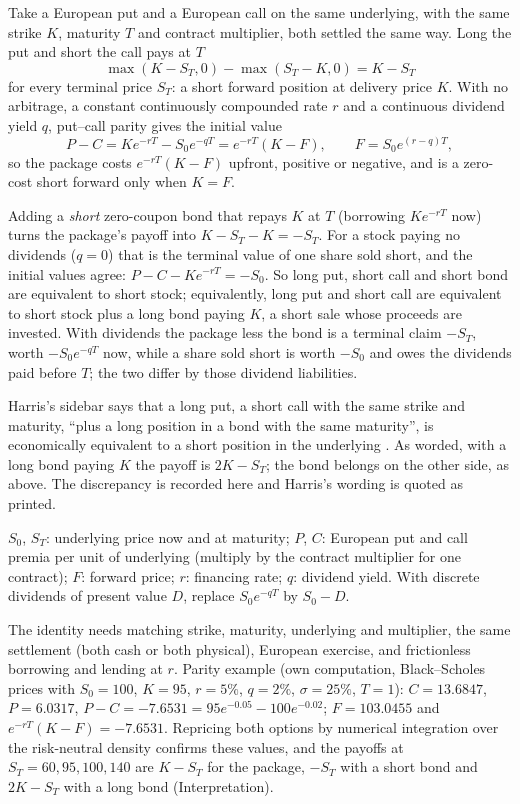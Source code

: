 \begin{qfresult}\label{res:synthetic-short-put-call}
 Take a European put and a European call on the same underlying, with the same strike $K$, maturity $T$ and contract multiplier, both settled the same way. Long the put and short the call pays at $T$
\[ \max(K-S_T,0)-\max(S_T-K,0)=K-S_T \]
for every terminal price $S_T$: a short forward position at delivery price $K$. With no arbitrage, a constant continuously compounded rate $r$ and a continuous dividend yield $q$, put--call parity gives the initial value
\[ P-C=Ke^{-rT}-S_0e^{-qT}=e^{-rT}(K-F),\qquad F=S_0e^{(r-q)T}, \]
so the package costs $e^{-rT}(K-F)$ upfront, positive or negative, and is a zero-cost short forward only when $K=F$.

Adding a \emph{short} zero-coupon bond that repays $K$ at $T$ (borrowing $Ke^{-rT}$ now) turns the package's payoff into $K-S_T-K=-S_T$. For a stock paying no dividends ($q=0$) that is the terminal value of one share sold short, and the initial values agree: $P-C-Ke^{-rT}=-S_0$. So long put, short call and short bond are equivalent to short stock; equivalently, long put and short call are equivalent to short stock plus a long bond paying $K$, a short sale whose proceeds are invested. With dividends the package less the bond is a terminal claim $-S_T$, worth $-S_0e^{-qT}$ now, while a share sold short is worth $-S_0$ and owes the dividends paid before $T$; the two differ by those dividend liabilities.

Harris's sidebar says that a long put, a short call with the same strike and maturity, ``plus a long position in a bond with the same maturity'', is economically equivalent to a short position in the underlying \citep[chap.~``Brokers'', sidebar ``Synthetic Short Positions'', p.~157]{alpha-harris}. As worded, with a long bond paying $K$ the payoff is $2K-S_T$; the bond belongs on the other side, as above. The discrepancy is recorded here and Harris's wording is quoted as printed.

 $S_0$, $S_T$: underlying price now and at maturity; $P$, $C$: European put and call premia per unit of underlying (multiply by the contract multiplier for one contract); $F$: forward price; $r$: financing rate; $q$: dividend yield. With discrete dividends of present value $D$, replace $S_0e^{-qT}$ by $S_0-D$.

 The identity needs matching strike, maturity, underlying and multiplier, the same settlement (both cash or both physical), European exercise, and frictionless borrowing and lending at $r$. Parity example (own computation, Black--Scholes prices with $S_0=100$, $K=95$, $r=5\%$, $q=2\%$, $\sigma=25\%$, $T=1$): $C=13.6847$, $P=6.0317$, $P-C=-7.6531=95e^{-0.05}-100e^{-0.02}$; $F=103.0455$ and $e^{-rT}(K-F)=-7.6531$. Repricing both options by numerical integration over the risk-neutral density confirms these values, and the payoffs at $S_T=60, 95, 100, 140$ are $K-S_T$ for the package, $-S_T$ with a short bond and $2K-S_T$ with a long bond (Interpretation).


\end{qfresult}
